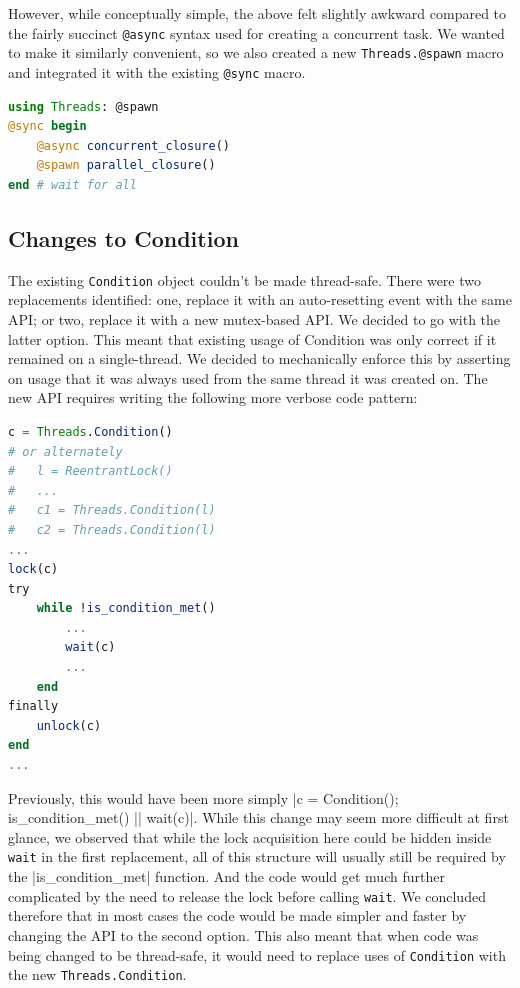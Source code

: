 \documentclass{juliacon}
\begin{document}
However, while conceptually simple, the above felt slightly awkward compared to the fairly succinct \verb|@async| syntax used for creating a concurrent task. We wanted to make it similarly convenient, so we also created a new \verb|Threads.@spawn| macro and integrated it with the existing \verb|@sync| macro.

\begin{lstlisting}[language = Julia]
using Threads: @spawn
@sync begin
    @async concurrent_closure()
    @spawn parallel_closure()
end # wait for all
\end{lstlisting}

\subsection{Changes to Condition}
\label{subsub:integration-condition}

The existing \verb|Condition| object couldn't be made thread-safe. There were two replacements identified: one, replace it with an auto-resetting event with the same API; or two, replace it with a new mutex-based API. We decided to go with the latter option. This meant that existing usage of Condition was only correct if it remained on a single-thread. We decided to mechanically enforce this by asserting on usage that it was always used from the same thread it was created on. The new API requires writing the following more verbose code pattern:

\begin{lstlisting}[language = Julia]
c = Threads.Condition()
# or alternately
#   l = ReentrantLock()
#   ...
#   c1 = Threads.Condition(l)
#   c2 = Threads.Condition(l)
...
lock(c)
try
    while !is_condition_met()
        ...
        wait(c)
        ...
    end
finally
    unlock(c)
end
...
\end{lstlisting}

Previously, this would have been more simply |c = Condition(); is_condition_met() || wait(c)|.  While this change may seem more difficult at first glance, we observed that while the lock acquisition here could be hidden inside \verb|wait| in the first replacement, all of this structure will usually still be required by the |is_condition_met| function. And the code would get much further complicated by the need to release the lock before calling \verb|wait|. We concluded therefore that in most cases the code would be made simpler and faster by changing the API to the second option. This also meant that when code was being changed to be thread-safe, it would need to replace uses of \verb|Condition| with the new \verb|Threads.Condition|.
\end{document}
